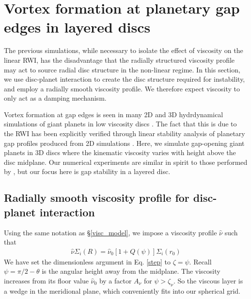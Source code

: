 \section{Vortex formation at planetary gap edges in layered
  discs}\label{disc-planet} 
The previous simulations, while necessary to isolate the effect of 
viscosity on the linear RWI, has the disadvantage that the radially
structured viscosity profile may act to source radial disc structure
in the non-linear regime. In this section, we use disc-planet interaction to
create the disc structure required for instability, and employ a radially smooth
viscosity profile. We therefore expect viscosity to only
act as a damping mechanism. 

Vortex formation at gap edges is seen in many  
2D and 3D hydrdynamical simulations of giant planets in low viscosity discs 
\citep{valborro07,lin10,lin11a,lin12}. The fact that this is due to
the RWI has been explicitly verified through linear stability
analysis of planetary gap profiles produced from 2D simulations
\citep{valborro07,lin10}. Here, we simulate gap-opening giant planets
in 3D discs where the kinematic viscosity varies with height above the
disc midplane. Our numerical experiments are similar in spirit to
those performed by \cite{pierens10}, but our focus here is gap
stability in a layered disc. 
 
\subsection{Radially smooth viscosity profile for disc-planet
  interaction}\label{planet_visc_mode} 
Using the same notation as \S\ref{visc_model}, we impose a viscosity
profile $\hat{\nu}$ such that 
\begin{align}\label{planet_visc_profile}
  \hat{\nu}\Sigma_i(R)=%
  \hat{\nu}_0\left[1+Q(\psi)\right]\Sigma_i(r_0)%
\end{align}
We have set the dimensionless argument in Eq. \ref{step} to
$\zeta=\psi$. Recall $\psi=\pi/2-\theta$ is the angular height away from the midplane. 
The viscosity increases from its floor value $\hat{\nu}_0$ by a factor
$A_\nu$ for $\psi > \zeta_\nu$. So the viscous layer is 
a wedge in the meridional plane, which conveniently fits into our
spherical grid. %

